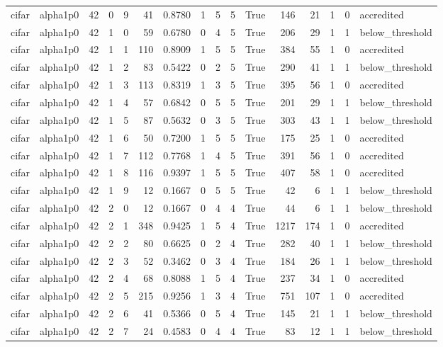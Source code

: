 \begin{tabular}{llrrrrrrrrrrrrrl}
cifar & alpha1p0 & 42 & 0 & 9 & 41 & 0.8780 & 1 & 5 & 5 & True & 146 & 21 & 1 & 0 & accredited \\
cifar & alpha1p0 & 42 & 1 & 0 & 59 & 0.6780 & 0 & 4 & 5 & True & 206 & 29 & 1 & 1 & below\_threshold \\
cifar & alpha1p0 & 42 & 1 & 1 & 110 & 0.8909 & 1 & 5 & 5 & True & 384 & 55 & 1 & 0 & accredited \\
cifar & alpha1p0 & 42 & 1 & 2 & 83 & 0.5422 & 0 & 2 & 5 & True & 290 & 41 & 1 & 1 & below\_threshold \\
cifar & alpha1p0 & 42 & 1 & 3 & 113 & 0.8319 & 1 & 3 & 5 & True & 395 & 56 & 1 & 0 & accredited \\
cifar & alpha1p0 & 42 & 1 & 4 & 57 & 0.6842 & 0 & 5 & 5 & True & 201 & 29 & 1 & 1 & below\_threshold \\
cifar & alpha1p0 & 42 & 1 & 5 & 87 & 0.5632 & 0 & 3 & 5 & True & 303 & 43 & 1 & 1 & below\_threshold \\
cifar & alpha1p0 & 42 & 1 & 6 & 50 & 0.7200 & 1 & 5 & 5 & True & 175 & 25 & 1 & 0 & accredited \\
cifar & alpha1p0 & 42 & 1 & 7 & 112 & 0.7768 & 1 & 4 & 5 & True & 391 & 56 & 1 & 0 & accredited \\
cifar & alpha1p0 & 42 & 1 & 8 & 116 & 0.9397 & 1 & 5 & 5 & True & 407 & 58 & 1 & 0 & accredited \\
cifar & alpha1p0 & 42 & 1 & 9 & 12 & 0.1667 & 0 & 5 & 5 & True & 42 & 6 & 1 & 1 & below\_threshold \\
cifar & alpha1p0 & 42 & 2 & 0 & 12 & 0.1667 & 0 & 4 & 4 & True & 44 & 6 & 1 & 1 & below\_threshold \\
cifar & alpha1p0 & 42 & 2 & 1 & 348 & 0.9425 & 1 & 5 & 4 & True & 1217 & 174 & 1 & 0 & accredited \\
cifar & alpha1p0 & 42 & 2 & 2 & 80 & 0.6625 & 0 & 2 & 4 & True & 282 & 40 & 1 & 1 & below\_threshold \\
cifar & alpha1p0 & 42 & 2 & 3 & 52 & 0.3462 & 0 & 3 & 4 & True & 184 & 26 & 1 & 1 & below\_threshold \\
cifar & alpha1p0 & 42 & 2 & 4 & 68 & 0.8088 & 1 & 5 & 4 & True & 237 & 34 & 1 & 0 & accredited \\
cifar & alpha1p0 & 42 & 2 & 5 & 215 & 0.9256 & 1 & 3 & 4 & True & 751 & 107 & 1 & 0 & accredited \\
cifar & alpha1p0 & 42 & 2 & 6 & 41 & 0.5366 & 0 & 5 & 4 & True & 145 & 21 & 1 & 1 & below\_threshold \\
cifar & alpha1p0 & 42 & 2 & 7 & 24 & 0.4583 & 0 & 4 & 4 & True & 83 & 12 & 1 & 1 & below\_threshold \\

\end{tabular}
